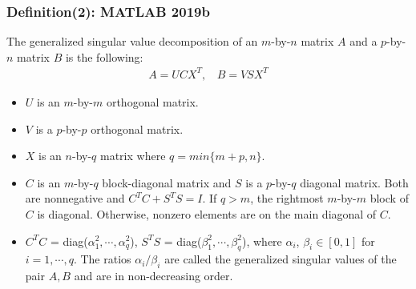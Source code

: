         \subsubsection{Definition(2): MATLAB 2019b \cite{MATLAB:2019}} \label{def_mat}
        
        The generalized singular value decomposition of an $m$-by-$n$ matrix $A$ and a $p$-by-$n$ matrix $B$ is the following:
        \begin{align}
            A = UCX^T, \ \   \ \ B = VSX^T
        \end{align}

        \begin{itemize}
            \item $U$ is an $m$-by-$m$ orthogonal matrix.
            \item $V$ is a $p$-by-$p$ orthogonal matrix.
            \item $X$ is an $n$-by-$q$ matrix where $q = min\{m + p, n\}$. 
            \item $C$ is an $m$-by-$q$ block-diagonal matrix and $S$ is a $p$-by-$q$ diagonal matrix. Both are nonnegative and $C^T C + S^T S = I$. If $q > m$, the rightmost $m$-by-$m$ block of $C$ is diagonal. Otherwise, nonzero elements are on the main diagonal of $C$.
            \item $C^T C $ = diag($\alpha_1^{2}, \cdots, \alpha_q^{2}$), $S^T S$ = diag($\beta_1^{2}, \cdots, \beta_q^{2}$), where $\alpha_i$, $\beta_i \in [0, 1]$ for $i = 1,\cdots, q$. The ratios $\alpha_i/\beta_i$ are called the generalized singular values of the pair $A, B$ and are in non-decreasing order.
        \end{itemize}
        
